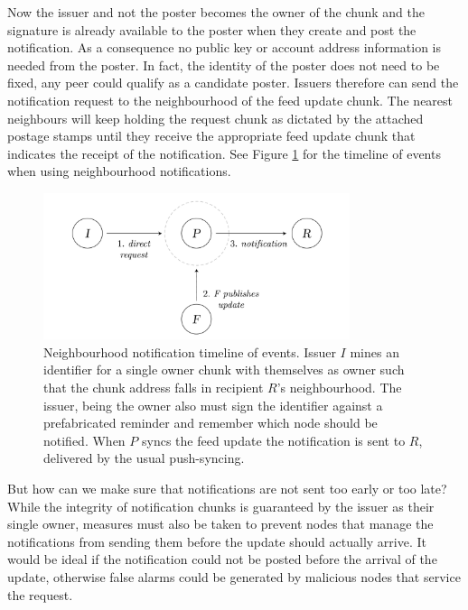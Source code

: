 Now the issuer and not the poster becomes the owner of the chunk and the signature is already available to the poster when they create and post the notification. As a consequence no public key or account address information is needed from the poster. In fact, the identity of the poster does not need to be fixed, any peer could qualify as a candidate poster. Issuers therefore can send the notification request to the neighbourhood of the feed update chunk. The nearest neighbours will keep holding the request chunk as dictated by the attached postage stamps until they receive the appropriate feed update chunk that indicates the receipt of the notification. See Figure \ref{fig:neighbourhood-notification-events} for the timeline of events when using neighbourhood notifications.

\begin{figure}[htbp]
\centering
\includegraphics[width=0.8\textwidth]{fig/neighbourhood-notification-events.pdf}
\caption[Neighbourhood notification timeline of events \statusgreen]{Neighbourhood notification timeline of events. Issuer $I$ mines an identifier for a single owner chunk with themselves as owner such that the chunk address falls in recipient $R$'s neighbourhood. The issuer, being the owner also must sign the identifier against a prefabricated reminder and remember which node should be notified. When $P$ syncs the feed update the notification is sent to $R$, delivered by the usual push-syncing.}
\label{fig:neighbourhood-notification-events}
\end{figure}
  

But how can we make sure that notifications are not sent too early or too late? While the integrity of notification chunks is guaranteed by the issuer as their single owner, measures must also be taken to prevent nodes that manage the notifications from sending them before the update should actually arrive. It would be ideal if the notification could not be posted before the arrival of the update, otherwise false alarms could be generated by malicious nodes that service the request.

